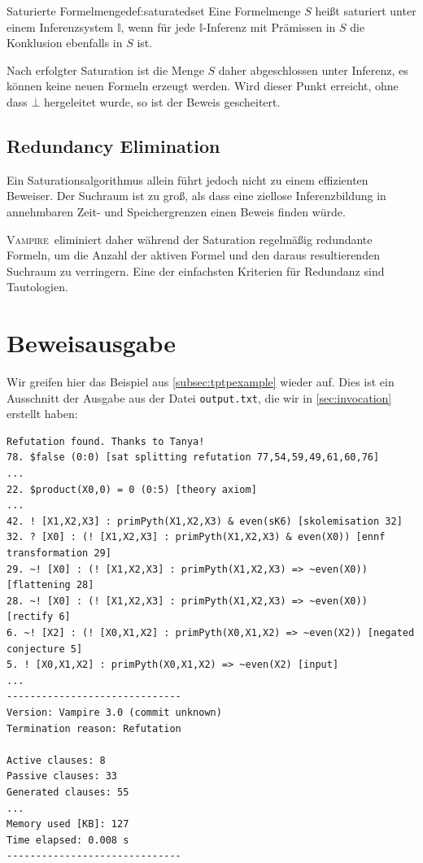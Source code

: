\documentclass{article}
\newcommand{\vampire}{\textsc{Vampire}~}
\begin{document}
\begin{definition}{Saturierte Formelmenge}{def:saturatedset}
	Eine Formelmenge $S$ heißt saturiert unter einem Inferenzsystem $\mathds{I}$, wenn für jede $\mathds{I}$-Inferenz mit Prämissen in $S$ die Konklusion ebenfalls in $S$ ist.
\end{definition}

Nach erfolgter Saturation ist die Menge $S$ daher abgeschlossen unter Inferenz, es können
keine neuen Formeln erzeugt werden.
Wird dieser Punkt erreicht, ohne dass $\bot$ hergeleitet wurde, so ist der Beweis gescheitert.

\subsection{Redundancy Elimination}
\label{subsec:redund}

Ein Saturationsalgorithmus allein führt jedoch nicht zu einem effizienten Beweiser.
Der Suchraum ist zu groß, als dass eine ziellose Inferenzbildung in annehmbaren Zeit- und
Speichergrenzen einen Beweis finden würde.

\vampire eliminiert daher während der Saturation regelmäßig redundante Formeln,
um die Anzahl der aktiven Formel und den daraus resultierenden Suchraum zu verringern.
Eine der einfachsten Kriterien für Redundanz sind Tautologien. 

\section{Beweisausgabe}
\label{sec:output}
Wir greifen hier das Beispiel aus \ref{subsec:tptpexample} wieder auf.
Dies ist ein Ausschnitt der Ausgabe aus der Datei \verb|output.txt|, die wir in \ref{sec:invocation}
erstellt haben:

\begin{verbatim}
Refutation found. Thanks to Tanya!
78. $false (0:0) [sat splitting refutation 77,54,59,49,61,60,76]
...
22. $product(X0,0) = 0 (0:5) [theory axiom]
...
42. ! [X1,X2,X3] : primPyth(X1,X2,X3) & even(sK6) [skolemisation 32]
32. ? [X0] : (! [X1,X2,X3] : primPyth(X1,X2,X3) & even(X0)) [ennf transformation 29]
29. ~! [X0] : (! [X1,X2,X3] : primPyth(X1,X2,X3) => ~even(X0)) [flattening 28]
28. ~! [X0] : (! [X1,X2,X3] : primPyth(X1,X2,X3) => ~even(X0)) [rectify 6]
6. ~! [X2] : (! [X0,X1,X2] : primPyth(X0,X1,X2) => ~even(X2)) [negated conjecture 5]
5. ! [X0,X1,X2] : primPyth(X0,X1,X2) => ~even(X2) [input]
...
------------------------------
Version: Vampire 3.0 (commit unknown)
Termination reason: Refutation

Active clauses: 8
Passive clauses: 33
Generated clauses: 55
...
Memory used [KB]: 127
Time elapsed: 0.008 s
------------------------------
\end{verbatim}
\end{document}
